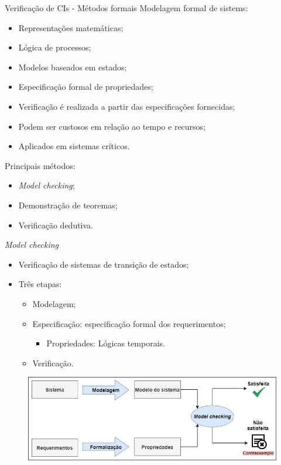 \begin{frame}{Verificação de CIs - Métodos formais}
    Modelagem formal de sistems:
    \begin{itemize}
        \item Representações matemáticas;
        \item Lógica de processos;
        \item Modelos baseados em estados;
        \item Especificação formal de propriedades;
        \item Verificação é realizada a partir das especificações fornecidas;
        \item Podem ser custosos em relação ao tempo e recursos;
        \item Aplicados em sistemas críticos.
    \end{itemize}
    Principais métodos:
    \begin{itemize}
        \item \textit{Model checking};
        \item Demonstração de teoremas;
        \item Verificação dedutiva.
    \end{itemize}
\end{frame}

\begin{frame}{\textit{Model checking}}
    \begin{itemize}
        \item Verificação de sistemas de transição de estados;
        \item Três etapas:
        \begin{itemize}
            \item Modelagem;
            \item Especificação: especificação formal dos requerimentos;
            \begin{itemize}
                \item Propriedades: Lógicas temporais.
            \end{itemize}
            \item Verificação.
        \end{itemize}
    \end{itemize}
    \begin{figure}[!htb]
     \centering
     \includegraphics[scale=0.4]{figuras/verificacao/model-checking.png}
    \end{figure}    
\end{frame}

